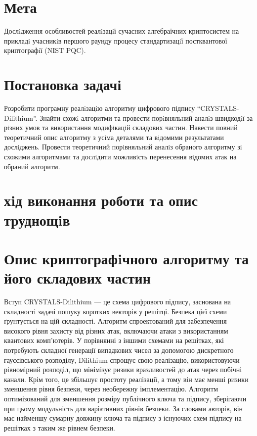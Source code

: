 \documentclass[12pt]{HomusWorkus}
\begin{document}

\addtocounter{page}{1}

\tableofcontents
\newpage


\section{Мета}

Дослiдження особливостей реалiзацiї сучасних алгебраїчних криптосистем на прикладi
учасникiв першого раунду процесу стандартизацiї постквантової криптографiї (NIST PQC).

\section{Постановка задачі}

Розробити програмну реалiзацiю алгоритму цифрового підпису ``CRYSTALS-Dilithium''.
Знайти схожi алгоритми та провести порiвняльний аналiз швидкодiї за рiзних умов та використання модифiкацiй складових частин.
Навести повний теоретичний опис алгоритму з усiма деталями та вiдомими результатами дослiджень.
Провести теоретичний порiвняльний аналiз обраного алгоритму зi схожими алгоритмами та дослiдити можливiсть перенесення вiдомих атак на обраний алгоритм.

\section{хiд виконання роботи та опис труднощiв}

\section{Опис криптографiчного алгоритму та його складових частин}

Вступ CRYSTALS-Dilithium — це схема цифрового підпису, заснована на складності задачі пошуку коротких векторів у решітці. Безпека цієї схеми ґрунтується на цій складності. Алгоритм спроектований для забезпечення високого рівня захисту від різних атак, включаючи атаки з використанням квантових комп'ютерів. У порівнянні з іншими схемами на решітках, які потребують складної генерації випадкових чисел за допомогою дискретного гауссівського розподілу, Dilithium спрощує свою реалізацію, використовуючи рівномірний розподіл, що мінімізує ризики вразливостей до атак через побічні канали. Крім того, це збільшує простоту реалізації, а тому він має менші ризики зменшення рівня безпеки, через необережну імплементацію. Алгоритм оптимізований для зменшення розміру публічного ключа та підпису, зберігаючи при цьому модульність для варіативних рівнів безпеки. За словами авторів, він має найменшу сумарну довжину ключа та підпису з існуючих схем підпису на решітках з таким же рівнем безпеки.
\end{document}
